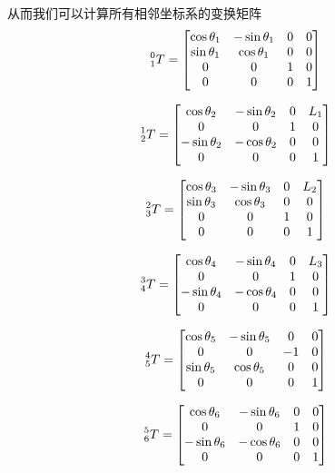 \documentclass{ctexart}
\begin{document}
从而我们可以计算所有相邻坐标系的变换矩阵
\[
    \prescript{0}{1}{T} =
    \begin{bmatrix}
        \cos \theta_1 & - \sin \theta_1 & 0 & 0 \\
        \sin \theta_1 & \cos \theta_1 & 0 & 0 \\
        0 & 0 & 1 & 0 \\
        0 & 0 & 0 & 1
    \end{bmatrix}
\]

\[
    \prescript{1}{2}{T} =
    \begin{bmatrix}
        \cos \theta_2 & - \sin \theta_2 & 0 & L_1 \\
        0 & 0 & 1 & 0 \\
        -\sin \theta_2 & - \cos \theta_2 & 0 & 0 \\
        0 & 0 & 0 & 1
    \end{bmatrix}
\]

\[
    \prescript{2}{3}{T} = 
    \begin{bmatrix}
        \cos \theta_3 & - \sin \theta_3 & 0 & L_2 \\
        \sin \theta_3 & \cos \theta_3 & 0 & 0 \\
        0 & 0 & 1 & 0 \\
        0 & 0 & 0 & 1
    \end{bmatrix}
\]

\[
    \prescript{3}{4}{T} =
    \begin{bmatrix}
        \cos \theta_4 & - \sin \theta_4 & 0 & L_3 \\
        0 & 0 & 1 & 0 \\
        -\sin \theta_4 & - \cos \theta_4 & 0 & 0 \\
        0 & 0 & 0 & 1
    \end{bmatrix}
\]

\[
    \prescript{4}{5}{T} =
    \begin{bmatrix}
        \cos \theta_5 & - \sin \theta_5 & 0 & 0 \\
        0 & 0 & -1 & 0 \\
        \sin \theta_5 & \cos \theta_5 & 0 & 0 \\
        0 & 0 & 0 & 1
    \end{bmatrix}
\]

\[
    \prescript{5}{6}{T} =
    \begin{bmatrix}
        \cos \theta_6 & - \sin \theta_6 & 0 & 0 \\
        0 & 0 & 1 & 0 \\
        -\sin \theta_6 & - \cos \theta_6 & 0 & 0 \\
        0 & 0 & 0 & 1
    \end{bmatrix}
\]
\end{document}

